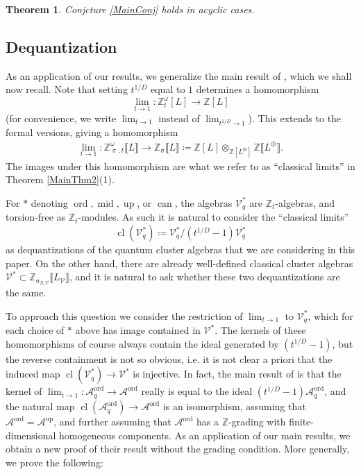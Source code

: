 \documentclass{amsart}
\DeclareMathOperator{\cl}{cl}
\DeclareMathOperator{\up}{up}
\DeclareMathOperator{\midd}{mid}
\DeclareMathOperator{\ord}{ord}
\DeclareMathOperator{\can}{can}
\let\llb=\llbracket
\let\rrb=\rrbracket
\let\bb=\mathbb
\let\rar=\rightarrow
\let\s=\mathcal
\renewcommand{\sigma}{\upsigma}
\theoremstyle{plain}%
\newtheorem{thm}{Theorem}[section]
\newcommand{\Z}{{\mathbb Z}}
\theoremstyle{definition}
\theoremstyle{remark}
\begin{document}
\begin{thm}\label{AcyclicLefschetz}
Conjcture \ref{MainConj} holds in acyclic cases.
\end{thm}



\subsection{Dequantization}


As an application of our results, we generalize the main result of \cite{GLSflat}, which we shall now recall.  Note that setting $t^{1/D}$ equal to $1$ determines a homomorphism 
$$\lim_{t\rar 1}\colon\Z_t^{\omega}[L]\rar \Z[L]$$
(for convenience, we write $\lim_{t\rar 1}$ instead of $\lim_{t^{1/D}\rar 1}$).  This extends to the formal versions, giving a homomorphism
\begin{align*}
    \lim_{t\rar 1} \colon \Z_{\sigma,t}^{\omega}\llb L\rrb \rar \Z_{\sigma}\llb L\rrb\coloneqq \Z[L]\otimes_{\Z[L^{\oplus}]} \Z\llb L^{\oplus} \rrb.
\end{align*}
The images under this homomorphism are what we refer to as ``classical limits'' in Theorem \ref{MainThm2}(1).  

For $*$ denoting $\ord,\midd,\up$, or $\can$, the algebras $\s{V}^*_q$ are $\mathbb{Z}_t$-algebras, and torsion-free as $\mathbb{Z}_t$-modules.  As such it is natural to consider the ``classical limits'' 
\[
\cl(\s{V}_q^*)\coloneqq \s{V}^*_q/(t^{1/D}-1)\s{V}^*_q
\]
as dequantizations of the quantum cluster algebras that we are considering in this paper.  On the other hand, there are already well-defined classical cluster algebras $\s{V}^*\subset \bb{Z}_{\sigma_{S,\s{V}}}\llb L_{\s{V}}\rrb$, and it is natural to ask whether these two dequantizations are the same.  

To approach this question we consider the restriction of $\lim_{t \rightarrow 1}$ to $\s{V}_q^*$, which for each choice of $*$ above has image contained in $\s{V}^*$.  The kernels of these homomorphisms of course always contain the ideal generated by $(t^{1/D}-1)$, but the reverse containment is not so obvious, i.e. it is not clear a priori that the induced map $\cl(\s{V}^*_q)\rightarrow \s{V}^*$ is injective.  In fact, the main result of \cite{GLSflat} is that the kernel of $\lim_{t\rar 1}:\s{A}_q^{\ord}\rar \s{A}^{\ord}$ really is equal to the ideal $( t^{1/D}-1 ) \s{A}_q^{\ord}$, and the natural map $\cl(\s{A}_q^{\ord})\rightarrow \s{A}^{\ord}$ is an isomorphism, assuming that $\s{A}^{\ord}=\s{A}^{\up}$, and further assuming that $\s{A}^{\ord}$ has a $\bb{Z}$-grading with finite-dimensional homogeneous components. As an application of our main results, we obtain a new proof of their result without the grading condition.  More generally, we prove the following:
\end{document}
